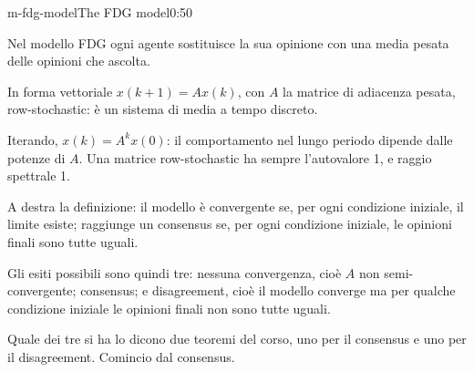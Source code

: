 
\begin{slide}{m-fdg-model}{The FDG model}{0:50}
  \begin{discorso}
    \item Nel modello FDG ogni agente sostituisce la sua opinione con una media pesata delle opinioni che ascolta.
    \item In forma vettoriale $x(k+1)=Ax(k)$, con $A$ la matrice di adiacenza pesata, row-stochastic: è un sistema di media a tempo discreto.
    \item Iterando, $x(k)=A^kx(0)$: il comportamento nel lungo periodo dipende dalle potenze di $A$. Una matrice row-stochastic ha sempre l'autovalore 1, e raggio spettrale 1.
    \item A destra la definizione: il modello è convergente se, per ogni condizione iniziale, il limite esiste; raggiunge un consensus se, per ogni condizione iniziale, le opinioni finali sono tutte uguali.
    \item Gli esiti possibili sono quindi tre: nessuna convergenza, cioè $A$ non semi-convergente; consensus; e disagreement, cioè il modello converge ma per qualche condizione iniziale le opinioni finali non sono tutte uguali.
    \item Quale dei tre si ha lo dicono due teoremi del corso, uno per il consensus e uno per il disagreement. Comincio dal consensus.
  \end{discorso}
\end{slide}

